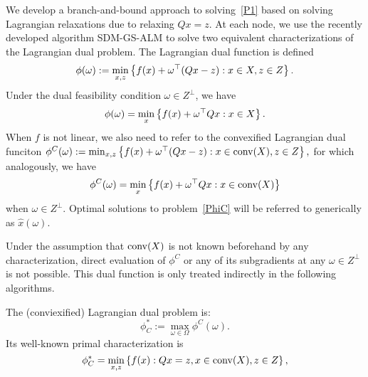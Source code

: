 We develop a branch-and-bound approach to solving~\eqref{P1} based on solving Lagrangian relaxations due to relaxing $Qx=z$.
At each node, we use the recently developed algorithm SDM-GS-ALM to solve two equivalent characterizations of the Lagrangian dual problem.
The Lagrangian dual function is defined 
$$\phi(\omega) := \min_{x,z} \left\{ f(x) + \omega^\top (Qx-z) : x \in X, z \in Z \right \}.$$ 
Under the dual feasibility condition $\omega \in Z^\perp$, we have 
$$\phi(\omega) = \min_x \left\{ f(x) + \omega^\top Qx : x \in X \right \}.$$ 
When $f$ is not linear, we also need to refer to the convexified Lagrangian dual funciton  
$\phi^C(\omega) := \min_{x,z} \left\{ f(x) + \omega^\top (Qx-z) : x \in \operatorname{conv}(X), z \in Z \right \},$ 
for which analogously,
we have 
\begin{equation}\label{PhiC}
\phi^C(\omega) = \min_x \left\{ f(x) + \omega^\top Qx : x \in \operatorname{conv}(X) \right \}
\end{equation} 
when $\omega \in Z^\perp$. Optimal solutions to problem~\eqref{PhiC} will be referred to generically as $\widehat{x}(\omega)$. 
\begin{remark}
Under the assumption that $\operatorname{conv}(X)$ is not known beforehand by any characterization, direct evaluation of $\phi^C$ or any of its subgradients at any $\omega \in Z^\perp$ is not possible. 
This dual function is only treated indirectly in the following algorithms.
\end{remark}



The (conviexified) Lagrangian dual problem is:
\begin{equation}\label{D1}
\phi_C^*:=\max_{\omega \in \Omega} \phi^C(\omega).
\end{equation}
Its well-known primal characterization is
\begin{equation}\label{D2}
\phi_C^*=\min_{x,z} \left\{ f(x) : Qx=z, x \in \operatorname{conv}(X), z \in Z \right \},
\end{equation}


